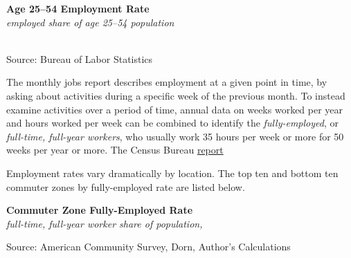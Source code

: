 \documentclass{report}
\makeatletter
\newcommand{\tbllink}[1]{\href{https://raw.githubusercontent.com/bdecon/US-chartbook/master/chartbook/data/#1}{\faTable}}
\newcommand*\short[1]{\expandafter\@gobbletwo\number\numexpr#1\relax}
\newcommand{\dateaxisticks}{
		date coordinates in=x, axis line style={draw=none},
		xmax={2022-03-15},
		max space between ticks=40,	    
		xtick={{1990-01-01}, {1992-01-01}, {1994-01-01}, 
			{1996-01-01}, {1998-01-01}, {2000-01-01}, 
			{2002-01-01}, {2004-01-01}, {2006-01-01},
			{2008-01-01}, {2010-01-01}, {2012-01-01}, {2014-01-01},
		    {2016-01-01}, {2018-01-01}, {2020-01-01}, {2022-01-01}, 
		    {2024-01-01}, {2026-01-01}},
		minor xtick={{1989-01-01}, {1991-01-01}, {1993-01-01},
			{1995-01-01}, {1997-01-01}, {1999-01-01}, 
			{2001-01-01}, {2003-01-01}, {2005-01-01}, {2007-01-01},
		    {2009-01-01}, {2011-01-01}, {2013-01-01}, {2015-01-01},
		    {2017-01-01}, {2019-01-01}, {2021-01-01}, {2023-01-01}, 
		    {2025-01-01}, {2027-01-01}},
		enlarge y limits={0.06}, enlarge x limits={0.01},
		}
\newcommand{\bbar}[2]{extra #1 ticks = {{#2}}, extra #1 tick labels = ,
		extra #1 tick style = {grid=major, grid style={thick, black!25}},}
\newcommand{\stdline}[4]{\addplot[very thick, no markers, color=#1] 
		table [x=#2, y=#3, col sep=comma] {#4};	}
\newcommand{\rbars}{
		\fill[color=black!10] (axis cs:{1990-07-01},\pgfkeysvalueof{/pgfplots/ymin}) rectangle 
			(axis cs:{1991-03-01}, \pgfkeysvalueof{/pgfplots/ymax});
		\fill[color=black!10] (axis cs:{2007-12-01},\pgfkeysvalueof{/pgfplots/ymin}) rectangle 
			(axis cs:{2009-07-01}, \pgfkeysvalueof{/pgfplots/ymax});
		\fill[color=black!10] (axis cs:{2001-03-01},\pgfkeysvalueof{/pgfplots/ymin}) rectangle 
			(axis cs:{2001-11-01}, \pgfkeysvalueof{/pgfplots/ymax});
		\fill[color=black!10] (axis cs:{2020-02-01},\pgfkeysvalueof{/pgfplots/ymin}) rectangle 
			(axis cs:{2020-05-01}, \pgfkeysvalueof{/pgfplots/ymax});}
\makeatother
\begin{document}
{\begin{minipage}{0.76\textwidth}
\normalsize \textbf{Age 25--54 Employment Rate}\\
\footnotesize{\textit{employed share of age 25--54 population}}\\
\hspace*{-2mm} \\
\footnotesize{Source: Bureau of Labor Statistics} \hfill \tbllink{epop.csv}
\vspace{1.5mm}

\small The monthly jobs report describes employment at a given point in time, by asking about activities during a specific week of the previous month. To instead examine activities over a period of time, annual data on weeks worked per year and hours worked per week can be combined to identify the \textit{fully-employed}, or \textit{full-time, full-year workers}, who usually work 35 hours per week or more for 50 weeks per year or more. The Census Bureau \href{https://www.census.gov/data/tables/time-series/demo/income-poverty/cps-pinc/pinc-01.html#par_textimage_14}{report} 

Employment rates vary dramatically by location. The top ten and bottom ten commuter zones by fully-employed rate are listed below.
\end{minipage}
\vspace{1mm}

\begin{minipage}{0.52\textwidth}
\normalsize \textbf{Commuter Zone Fully-Employed Rate}\\
\footnotesize{\textit{full-time, full-year worker share of population, }}\\
\vspace{1mm}

\hspace{-11mm} 

\vspace{-4mm}
\footnotesize{Source: American Community Survey, Dorn, Author's Calculations}
\end{minipage} \hspace{3mm}
\begin{minipage}{0.24\textwidth}
\vspace{-1mm}


\end{minipage}}
\end{document}
